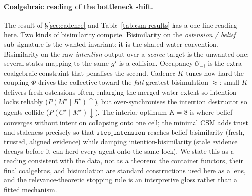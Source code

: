 \documentclass{article}
\newcommand{\method}[1]{\texttt{#1}}
\begin{document}
\paragraph{Coalgebraic reading of the bottleneck shift.}
The result of \S\ref{sec:cadence} and Table~\ref{tab:csm-results} has a
one-line reading here. Two kinds of bisimilarity compete. Bisimilarity on the
\emph{ostension / belief} sub-signature is the wanted invariant: it is the
shared water convention. Bisimilarity on the raw \emph{intention} output over
a \emph{scarce} target is the unwanted one: several states mapping to the same
$g^{\star}$ is a collision. Occupancy $\mathcal{O}_{-i}$ is the
extra-coalgebraic constraint that penalises the second. Cadence $K$ tunes how
hard the coupling $\Phi$ drives the collective toward the \emph{full}
greatest bisimulation $\approx$: small $K$ delivers fresh ostensions often,
enlarging the merged water extent so intention locks reliably
($P(M^\star\mid R^\star)\uparrow$), but over-synchronises the intention
destructor so agents collide ($P(C^\star\mid M^\star)\downarrow$). The
interior optimum $K{=}8$ is where belief converges without intention
collapsing onto one cell; the minimal CSM adds trust and staleness precisely
so that $\method{step\_intension}$ reaches belief-bisimilarity (fresh,
trusted, aligned evidence) while damping intention-bisimilarity (stale
evidence decays before it can herd every agent onto the same lock). We state
this as a reading consistent with the data, not as a theorem: the container
functors, their final coalgebras, and bisimulation are standard constructions
used here as a lens, and the relevance-theoretic stopping rule is an
interpretive gloss rather than a fitted mechanism.
\end{document}
